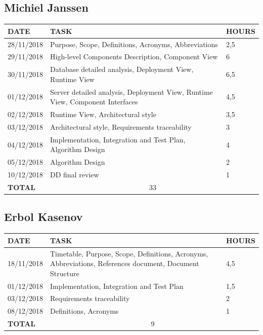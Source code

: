 \documentclass[12pt]{article}
\begin{document}
\subsection{Michiel Janssen}

\begin{center}
\begin{tabular}{ |p{}|p{}|p{}| } 
 \hline
 \textbf{DATE} & \textbf{TASK} & \textbf{HOURS} \\ 
 \hline 
  28/11/2018 & Purpose, Scope, Definitions, Acronyms, Abbreviations & 2,5\\
  \hline
  29/11/2018 & High-level Components Description, Component View & 6\\
  \hline
  30/11/2018 & Database detailed analysis, Deployment View, Runtime View & 6,5\\
  \hline
  01/12/2018 & Server detailed analysis, Deployment View, Runtime View, Component Interfaces & 4,5\\
  \hline
  02/12/2018 & Runtime View, Architectural style & 3,5\\
  \hline
  03/12/2018 & Architectural style, Requirements traceability & 3\\
  \hline
  04/12/2018 & Implementation, Integration and Test Plan, Algorithm Design & 4 \\
  \hline
  05/12/2018 & Algorithm Design & 2\\
  \hline
  10/12/2018 & DD final review & 1\\
  \hline
  \textbf{TOTAL} & \multicolumn{2}{c|}{33} \\ 
  \hline
\end{tabular}
\end{center}


\subsection{Erbol Kasenov}

\begin{center}
\begin{tabular}{ |p{}|p{}|p{}| } 
 \hline
 \textbf{DATE} & \textbf{TASK} & \textbf{HOURS} \\ 
  \hline
  18/11/2018 & Timetable, Purpose, Scope, Definitions, Acronyms, 
  Abbreviations, References document, Document Structure & 4,5\\ 
  \hline
  01/12/2018 & Implementation, Integration and Test Plan & 1,5\\ 
   \hline
  03/12/2018 & Requirements traceability & 2 \\ 
  \hline
  08/12/2018 & Definitions, Acronyms & 1\\
  \hline
  \textbf{TOTAL} & \multicolumn{2}{c|}{9} \\ 
  \hline
\end{tabular}
\end{center}
\end{document}
